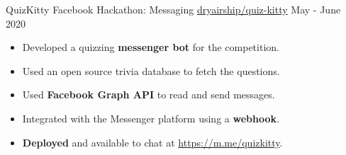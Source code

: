 \cventry
{QuizKitty}
{Facebook Hackathon: Messaging}
{
  \href{https://github.com/dryairship/quiz-kitty}{\faGithub{} dryairship/quiz-kitty}
}
{May - June 2020}
{
  \begin{itemize}
  \item Developed a quizzing \textbf{messenger bot} for the competition.
  \item Used an open source trivia database to fetch the questions.
  \item Used \textbf{Facebook Graph API} to read and send messages.
  \item Integrated with the Messenger platform using a \textbf{webhook}.
  \item \textbf{Deployed} and available to chat at \href{https://m.me/quizkitty}{https://m.me/quizkitty}.
  \end{itemize}
}

\vspace{-2mm}

